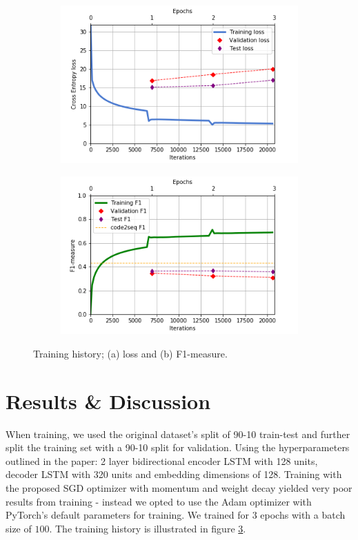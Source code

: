 \documentclass{article} %
\begin{document}
\begin{figure}[hbt!]
\centering
\begin{subfigure}{.5\textwidth}
  \centering
  \includegraphics[width=\linewidth]{imgs/losses1.png}
  \caption{}
  \label{fig:loss}
\end{subfigure}%
\begin{subfigure}{.5\textwidth}
  \centering
  \includegraphics[width=\linewidth]{imgs/f11.png}
  \caption{}
  \label{fig:f1}
\end{subfigure}
\caption{Training history; (a) loss and (b) F1-measure.}
\label{fig:training-hist}
\end{figure}

\section{Results \& Discussion} \label{sec:results}
When training, we used the original dataset's split of 90-10 train-test and further split the training set with a 90-10 split for validation. Using the hyperparameters outlined in the paper: 2 layer bidirectional encoder LSTM with 128 units, decoder LSTM with 320 units and embedding dimensions of 128. Training with the proposed SGD optimizer with momentum and weight decay yielded very poor results from training - instead we opted to use the Adam optimizer with PyTorch's default parameters for training. We trained for $3$ epochs with a batch size of $100$. The training history is illustrated in figure \ref{fig:training-hist}. 
\end{document}
